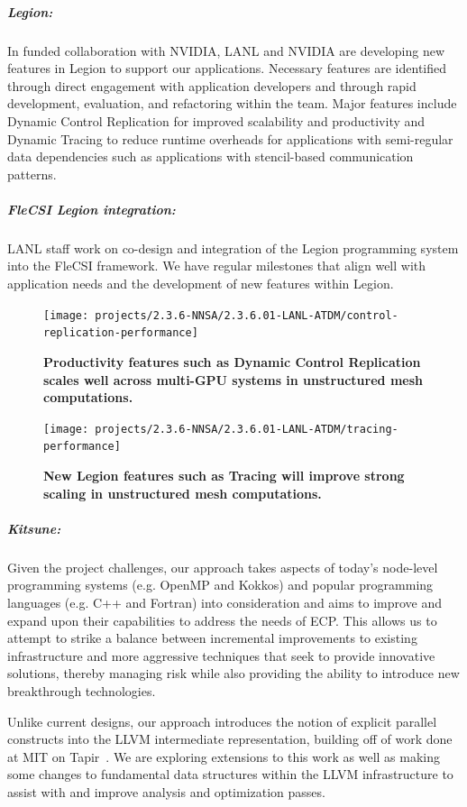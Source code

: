 \subparagraph{Legion:}

In funded collaboration with NVIDIA, LANL and NVIDIA are developing new features in Legion to support our applications. Necessary features are identified through direct engagement with application developers and through rapid development, evaluation, and refactoring within the team. Major features include Dynamic Control Replication for improved scalability and productivity and Dynamic Tracing to reduce runtime overheads for  applications with semi-regular data dependencies such as applications with stencil-based communication patterns. 


\subparagraph{FleCSI Legion integration:}
LANL staff work on co-design and integration of the Legion programming system into the FleCSI framework. We have regular milestones that align well with application needs and the development of new features within Legion. 


\begin{figure}[htb]
  \centering
  \texttt{[image: projects/2.3.6-NNSA/2.3.6.01-LANL-ATDM/control-replication-performance]}
        \caption{\label{fig:control-replication-performance}\textbf{Productivity features such as Dynamic Control Replication scales well across multi-GPU systems in unstructured mesh computations.}}
\end{figure}

\begin{figure}[htb]
        \centering
        \texttt{[image: projects/2.3.6-NNSA/2.3.6.01-LANL-ATDM/tracing-performance]}
        \caption{\label{fig:tracing-performance}\textbf{New Legion features such as Tracing will improve strong scaling in unstructured mesh computations.}}
\end{figure}


\subparagraph{Kitsune:}
Given the project challenges, our approach takes aspects of
today's node-level programming systems (e.g. OpenMP and Kokkos) and
popular programming languages (e.g. C++ and Fortran) into
consideration and aims to improve and expand upon their capabilities
to address the needs of ECP.  This allows us to attempt to strike a
balance between incremental improvements to existing infrastructure
and more aggressive techniques that seek to provide innovative
solutions, thereby managing risk while also providing the ability to introduce new
breakthrough technologies.

Unlike current designs, our approach introduces the notion of explicit
parallel constructs into the LLVM intermediate representation, building
off of work done at MIT on Tapir~\cite{2.3.6.01:kitsune:Schardl:2017}. 
We are exploring extensions to this work as well as making some changes
to fundamental data structures within the LLVM infrastructure to assist with
and improve analysis and optimization passes. 



